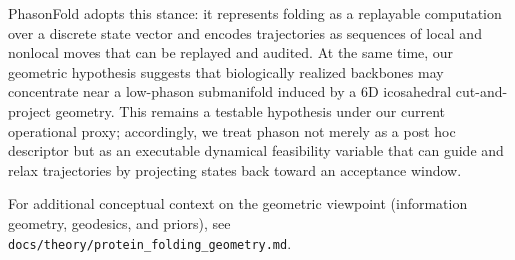 PhasonFold adopts this stance: it represents folding as a replayable computation over a discrete state vector and encodes trajectories as sequences of local and nonlocal moves that can be replayed and audited. At the same time, our geometric hypothesis suggests that biologically realized backbones may concentrate near a low-phason submanifold induced by a 6D icosahedral cut-and-project geometry. This remains a testable hypothesis under our current operational proxy; accordingly, we treat phason not merely as a post hoc descriptor but as an executable dynamical feasibility variable that can guide and relax trajectories by projecting states back toward an acceptance window.

For additional conceptual context on the geometric viewpoint (information geometry, geodesics, and priors), see \texttt{docs/theory/protein\_folding\_geometry.md}.
